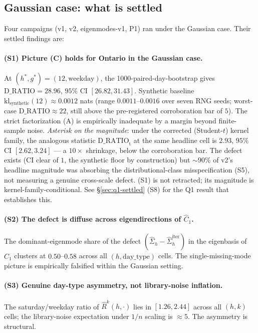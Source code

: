 \documentclass[11pt]{article}
\newcommand{\Studt}{\mathrm{t}}
\theoremstyle{definition}
\theoremstyle{plain}
\begin{document}
\subsection{Gaussian case: what is settled}
\label{sec:settled}

Four campaigns (v1, v2, eigenmodes-v1, P1) ran under the Gaussian
case. Their settled findings are:

\paragraph{(S1) Picture (C) holds for Ontario in the Gaussian case.}
At $(h^{*}, g^{*}) = (12, \mathrm{weekday})$, the 1000-paired-day-bootstrap
gives $\mathrm{D\_RATIO} = 28.96$, $95\%$ CI $[26.82, 31.43]$.
Synthetic baseline $\mathrm{kl}_{\text{synthetic}}(12) \approx 0.0012$
nats (range $0.0011$--$0.0016$ over seven RNG seeds; worst-case
$\mathrm{D\_RATIO} \approx 22$, still above the pre-registered
corroboration bar of $5$). The strict factorization (A) is
empirically inadequate by a margin beyond finite-sample noise.
\emph{Asterisk on the magnitude}: under the corrected (Student-$t$)
kernel family, the analogous statistic $\mathrm{D\_RATIO}_{\Studt}$
at the same headline cell is $2.93$, $95\%$ CI $[2.62, 3.24]$ --- a
$10\times$ shrinkage, below the corroboration bar. The defect exists
(CI clear of $1$, the synthetic floor by construction) but
$\sim 90\%$ of v2's headline magnitude was absorbing the
distributional-class misspecification (S5), not measuring a
genuine cross-scale defect. (S1) is not retracted; its magnitude
is kernel-family-conditional. See \S\ref{sec:q1-settled} (S8) for
the Q1 result that establishes this.

\paragraph{(S2) The defect is diffuse across eigendirections of
$\hat C_1$.}
The dominant-eigenmode share of the defect
$(\hat\Sigma_h - \hat\Sigma_h^{\mathrm{iter}})$ in the eigenbasis of
$\hat C_1$ clusters at $0.50$--$0.58$ across all
$(h, \text{day\_type})$ cells. The single-missing-mode picture
is empirically falsified within the Gaussian setting.

\paragraph{(S3) Genuine day-type asymmetry, not library-noise
inflation.}
The saturday/weekday ratio of $\hat R^{k}(h, \cdot)$ lies in
$[1.26, 2.44]$ across all $(h, k)$ cells; the library-noise
expectation under $1/n$ scaling is $\approx 5$. The asymmetry is
structural.
\end{document}
